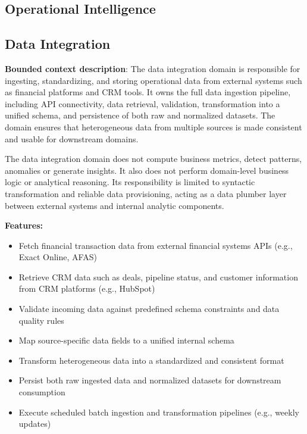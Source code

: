 \documentclass[
  letterpaper,
  DIV=11,
  numbers=noendperiod]{scrartcl}
\begin{document}
\subsection{\texorpdfstring{\textbf{Operational
Intelligence}}{Operational Intelligence}}\label{operational-intelligence}

\subsection{\texorpdfstring{\textbf{Data
Integration}}{Data Integration}}\label{data-integration}

\textbf{Bounded context description}: The data integration domain is
responsible for ingesting, standardizing, and storing operational data
from external systems such as financial platforms and CRM tools. It owns
the full data ingestion pipeline, including API connectivity, data
retrieval, validation, transformation into a unified schema, and
persistence of both raw and normalized datasets. The domain ensures that
heterogeneous data from multiple sources is made consistent and usable
for downstream domains.~

The data integration domain does not compute business metrics, detect
patterns, anomalies or generate insights. It also does not perform
domain-level business logic or analytical reasoning. Its responsibility
is limited to syntactic transformation and reliable data provisioning,
acting as a data plumber layer between external systems and internal
analytic components.~

\textbf{Features:}

\begin{itemize}
\item
  Fetch financial transaction data from external financial systems APIs
  (e.g., Exact Online, AFAS)
\item
  Retrieve CRM data such as deals, pipeline status, and customer
  information from CRM platforms (e.g., HubSpot)
\item
  Validate incoming data against predefined schema constraints and data
  quality rules
\item
  Map source-specific data fields to a unified internal schema
\item
  Transform heterogeneous data into a standardized and consistent format
\item
  Persist both raw ingested data and normalized datasets for downstream
  consumption
\item
  Execute scheduled batch ingestion and transformation pipelines (e.g.,
  weekly updates)
\end{itemize}
\end{document}
